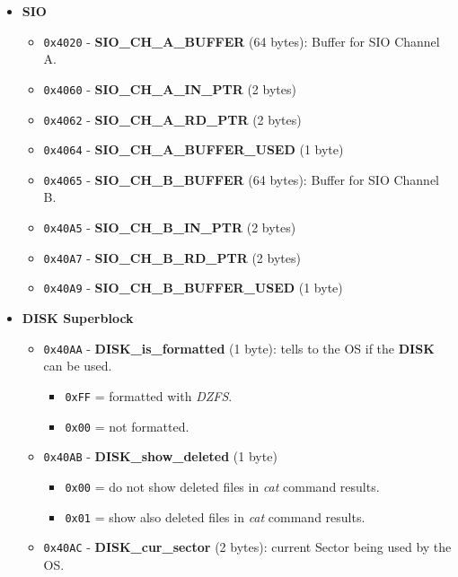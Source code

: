 \documentclass[a4paper,11pt]{article}
\begin{document}
    \begin{itemize}
        \item \textbf{SIO}
        \begin{itemize}
            \item \texttt{0x4020} - \textbf{SIO\_CH\_A\_BUFFER} (64 bytes):
            Buffer for SIO Channel A.
            \item \texttt{0x4060} - \textbf{SIO\_CH\_A\_IN\_PTR} (2 bytes)
            \item \texttt{0x4062} - \textbf{SIO\_CH\_A\_RD\_PTR} (2 bytes)
            \item \texttt{0x4064} - \textbf{SIO\_CH\_A\_BUFFER\_USED} (1 byte)
            \item \texttt{0x4065} - \textbf{SIO\_CH\_B\_BUFFER} (64 bytes):
            Buffer for SIO Channel B.
            \item \texttt{0x40A5} - \textbf{SIO\_CH\_B\_IN\_PTR} (2 bytes)
            \item \texttt{0x40A7} - \textbf{SIO\_CH\_B\_RD\_PTR} (2 bytes)
            \item \texttt{0x40A9} - \textbf{SIO\_CH\_B\_BUFFER\_USED} (1 byte)
        \end{itemize}
        \item \textbf{DISK Superblock}
        \begin{itemize}
            \item \texttt{0x40AA} - \textbf{DISK\_is\_formatted} (1 byte): tells
            to the OS if the \textbf{DISK} can be used.
            \begin{itemize}
                \item \texttt{0xFF} = formatted with \textit{DZFS}.
                \item \texttt{0x00} = not formatted.
            \end{itemize}
            \item \texttt{0x40AB} - \textbf{DISK\_show\_deleted} (1 byte)
            \begin{itemize}
                \item \texttt{0x00} = do not show deleted files in \textit{cat}
                command results.
                \item \texttt{0x01} = show also deleted files in \textit{cat}
                command results.
            \end{itemize}
            \item \texttt{0x40AC} - \textbf{DISK\_cur\_sector} (2 bytes): current
            Sector being used by the OS.

\end{itemize}
\end{itemize}
\end{document}
